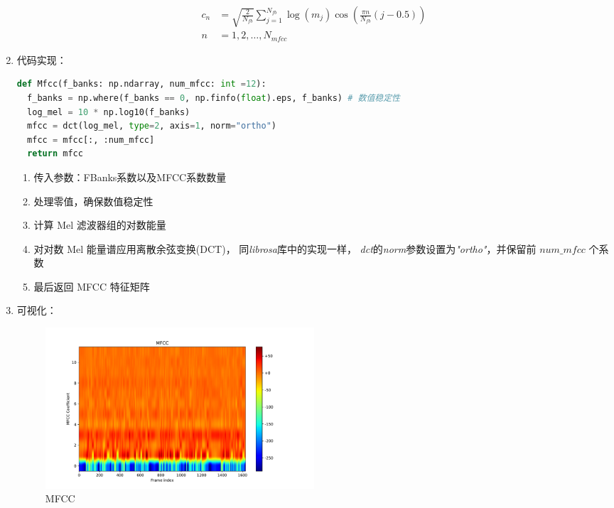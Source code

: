 \documentclass[a4paper]{article}
\begin{document}
\begin{enumerate}
{    \begin{equation}
      \begin{split}
          c_n &= \sqrt{\frac{2}{N_{fb}}}\sum_{j=1}^{N_{fb}}\log(m_j)\cos\left(\frac{\pi n}{N_{fb}}\left(j - 0.5\right)\right) \\
          n &= 1, 2, \dots, N_{mfcc}
          \label{eq:MFCC}
      \end{split}
  \end{equation}
  }
  \item 
  {
    代码实现：
    \begin{lstlisting}[language=python]
def Mfcc(f_banks: np.ndarray, num_mfcc: int =12):
  f_banks = np.where(f_banks == 0, np.finfo(float).eps, f_banks) # 数值稳定性
  log_mel = 10 * np.log10(f_banks)
  mfcc = dct(log_mel, type=2, axis=1, norm="ortho")
  mfcc = mfcc[:, :num_mfcc]
  return mfcc
    \end{lstlisting}
    \begin{enumerate}
      \item 传入参数：FBanks系数以及MFCC系数数量
      \item 处理零值，确保数值稳定性
      \item 计算 Mel 滤波器组的对数能量
      \item 对对数 Mel 能量谱应用离散余弦变换(DCT)，
      同\emph{librosa}库中的实现一样，
      \emph{dct}的\emph{norm}参数设置为\emph{"ortho"}，并保留前 $num\_mfcc$ 个系数
      \item 最后返回 MFCC 特征矩阵
    \end{enumerate}
  }

  \item 
  {
    可视化：
    \begin{figure}[H]
      \centering
      \includegraphics[width=0.5\textwidth]{figs/visualize_MFCC.pdf}
      \caption{MFCC}
      \label{fig:MFCC}
    \end{figure}
  }
\end{enumerate}
\end{document}
